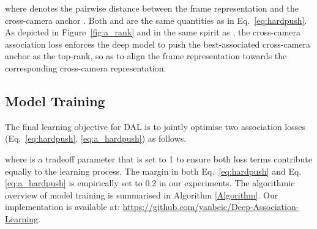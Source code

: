 \documentclass{bmvc2k}
\begin{document}
where  denotes the pairwise distance between the frame representation  and the {cross-camera anchor} . 
Both  and  are the same quantities as  in Eq.~\eqref{eq:hardpush}. As depicted in Figure~\ref{fig:a_rank} and in the same spirit as , the cross-camera association loss  enforces the deep model to push the best-associated {cross-camera anchor} as the top-rank, so as to align the frame representation  towards the corresponding cross-camera representation. 

\vspace{-0.2cm}
\subsection{Model Training}
The final learning objective for DAL is to jointly optimise two association losses (Eq.~\eqref{eq:hardpush},
\eqref{eq:a_hardpush}) as follows. 

where  is a tradeoff parameter that is set to 1 to 
ensure both loss terms contribute equally to the learning process. 
The margin  in both Eq.~\eqref{eq:hardpush} and Eq. \eqref{eq:a_hardpush} 
is empirically set to 0.2 in our experiments.
The algorithmic overview of model training is summarised in Algorithm \ref{Algorithm}. 
Our implementation is available at: \href{https://github.com/yanbeic/Deep-Association-Learning}{\color{VioletRed}https://github.com/yanbeic/Deep-Association-Learning}.
\end{document}
